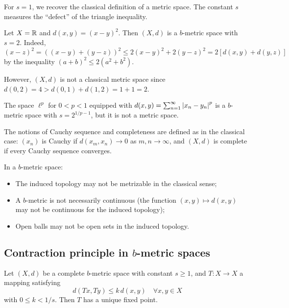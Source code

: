 \begin{remark}
For $s = 1$, we recover the classical definition of a metric space. The constant
$s$ measures the ``defect'' of the triangle inequality.
\end{remark}

\begin{example}
Let $X = \mathbb{R}$ and $d(x, y) = (x - y)^2$. Then $(X, d)$ is a $b$-metric space
with $s = 2$. Indeed, $(x - z)^2 = ((x-y) + (y-z))^2 \leq 2(x-y)^2 + 2(y-z)^2
= 2[d(x,y) + d(y,z)]$ by the inequality $(a + b)^2 \leq 2(a^2 + b^2)$.

However, $(X, d)$ is not a classical metric space since
$d(0, 2) = 4 > d(0, 1) + d(1, 2) = 1 + 1 = 2$.
\end{example}

\begin{example}
The space $\ell^p$ for $0 < p < 1$ equipped with $d(x, y) = \sum_{n=1}^\infty
\left| x_n - y_n \right|^p$ is a $b$-metric space with $s = 2^{1/p - 1}$, but it is not
a metric space.
\end{example}

\begin{definition}
The notions of Cauchy sequence and completeness are defined as in the classical
case: $(x_n)$ is Cauchy if $d(x_m, x_n) \to 0$ as $m, n \to \infty$, and
$(X, d)$ is complete if every Cauchy sequence converges.
\end{definition}

\begin{warning}[title=\textbf{Difficulties specific to $b$-metrics}]
In a $b$-metric space:
\begin{itemize}
    \item The induced topology may not be metrizable in the classical sense;
    \item A $b$-metric is not necessarily continuous (the function
          $(x, y) \mapsto d(x, y)$ may not be continuous for the induced topology);
    \item Open balls may not be open sets in the induced topology.
\end{itemize}
\end{warning}

\subsection{Contraction principle in $b$-metric spaces}

\begin{theorem}\label{thm:banach-b}
Let $(X, d)$ be a complete $b$-metric space with constant $s \geq 1$, and
$T : X \to X$ a mapping satisfying
\[
    d(Tx, Ty) \leq k \, d(x, y) \quad \forall x, y \in X
\]
with $0 \leq k < 1/s$. Then $T$ has a unique fixed point.
\end{theorem}

